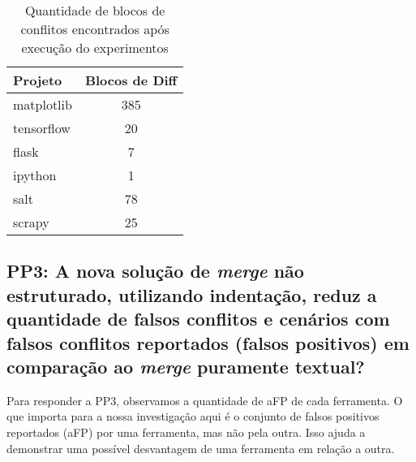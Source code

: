 \begin{table}[ht]
	\begin{center}
		\begin{tabular}{|l|c|}
			\hline
			\textbf{Projeto} & \textbf{Blocos de Diff} \\
			\hline
			matplotlib       & 385                     \\
			tensorflow       & 20                      \\
			flask            & 7                       \\
			ipython          & 1                       \\
			salt             & 78                      \\
			scrapy           & 25                      \\
			\hline
		\end{tabular}
	\end{center}
	\caption{Quantidade de blocos de conflitos encontrados após execução do experimentos}\label{block_diff}
\end{table}

\subsection{PP3: A nova solução de \emph{merge} não estruturado, utilizando indentação,
	reduz a quantidade de falsos conflitos e cenários com falsos conflitos reportados
	(falsos positivos) em comparação ao \emph{merge} puramente textual?}
Para responder a PP3, observamos a quantidade de aFP de cada ferramenta.
O que importa para a nossa investigação aqui é o conjunto de falsos positivos reportados (aFP)
por uma ferramenta, mas não pela outra. Isso ajuda a demonstrar uma possível desvantagem de
uma ferramenta em relação a outra.

